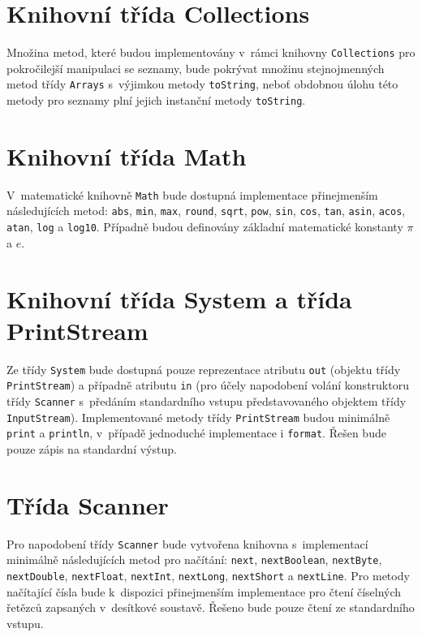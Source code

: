 \documentclass{bakalarka}
\begin{document}
\section{Knihovní třída Collections}
Množina metod, které budou implementovány v~rámci knihovny \texttt{Collections} pro pokročilejší manipulaci se seznamy, bude pokrývat množinu stejnojmenných metod třídy \texttt{Arrays} s~výjimkou metody \texttt{toString}, neboť obdobnou úlohu této metody pro seznamy plní jejich instanční metody \texttt{toString}.

\section{Knihovní třída Math}
V~matematické knihovně \texttt{Math} bude dostupná implementace přinejmenším následujících metod: \texttt{abs}, \texttt{min}, \texttt{max}, \texttt{round}, \texttt{sqrt}, \texttt{pow}, \texttt{sin}, \texttt{cos}, \texttt{tan}, \texttt{asin}, \texttt{acos}, \texttt{atan}, \texttt{log} a \texttt{log10}. Případně budou definovány základní matematické konstanty $\pi$ a $e$.

\section{Knihovní třída System a třída PrintStream}
Ze třídy \texttt{System} bude dostupná pouze reprezentace atributu \texttt{out} (objektu třídy \texttt{PrintStream}) a případně atributu \texttt{in} (pro účely napodobení volání konstruktoru třídy \texttt{Scanner} s~předáním standardního vstupu představovaného objektem třídy \texttt{InputStream}). Implementované metody třídy \texttt{PrintStream} budou minimálně \texttt{print} a \texttt{println}, v~případě jednoduché implementace i \texttt{format}. Řešen bude pouze zápis na standardní výstup.

\section{Třída Scanner}
Pro napodobení třídy \texttt{Scanner} bude vytvořena knihovna s~implementací minimálně následujících metod pro načítání: \texttt{next}, \texttt{nextBoolean}, \texttt{nextByte}, \texttt{nextDouble}, \texttt{nextFloat}, \texttt{nextInt}, \texttt{nextLong}, \texttt{nextShort} a \texttt{nextLine}. Pro metody načítající čísla bude k~dispozici přinejmenším implementace pro čtení číselných řetězců zapsaných v~desítkové soustavě. Řešeno bude pouze čtení ze standardního vstupu.
\end{document}
